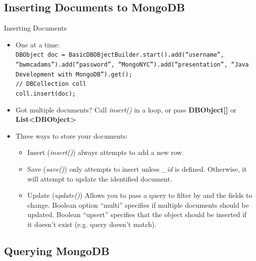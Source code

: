 \documentclass{beamer}
\begin{document}
\subsection[Inserting Documents to MongoDB]{Inserting Documents to MongoDB}

\begin{frame}{Inserting Documents}
    \begin{itemize}
        \item<2-> One at a time:\\
            \texttt{\tiny DBObject doc = BasicDBOBjectBuilder.start().add(``username'', ``bwmcadams'').add(``password'', ``MongoNYC'').add(``presentation'', ``Java Development with MongoDB'').get();\\
            // DBCollection coll\\
            coll.insert(doc);\\
            }
        \item<3-> Got multiple documents? Call {\em insert()} in a loop, or pass {\bf DBObject[]} or {\bf List<DBObject>}
        \item<4-> Three ways to store your documents:
        \begin{itemize}
            \item {\sc Insert} ({\em insert()}) always attempts to add a new row.
            \item {\sc Save} ({\em save()}) only attempts to insert unless {\em \_id} is defined.  Otherwise, it will attempt to update the identified document.
            \item {\sc Update} ({\em update()}) Allows you to pass a query to filter by and the fields to change.  Boolean option ``multi'' specifies if multiple documents should be updated.  Boolean ``upsert'' specifies that the object should be inserted if it doesn't exist (e.g. query doesn't match).
        \end{itemize}
    \end{itemize}
\end{frame}

\subsection[Querying MongoDB]{Querying MongoDB}
\end{document}
